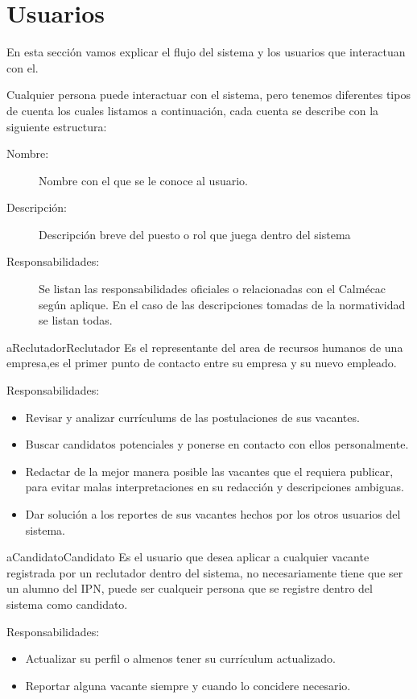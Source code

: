 \chapter{Usuarios}
En esta sección vamos explicar el flujo del sistema y los usuarios que interactuan con el.

Cualquier persona puede interactuar con el sistema, pero tenemos diferentes tipos de cuenta los cuales listamos a continuación,
cada cuenta se describe con la siguiente estructura:

\begin{description}
	\item[Nombre:] Nombre con el que se le conoce al usuario.
	\item[Descripción:] Descripción breve del puesto o rol que juega dentro del sistema
	\item[Responsabilidades:] Se listan las responsabilidades oficiales o relacionadas con el Calmécac según aplique. En el caso de las descripciones tomadas de la normatividad se listan todas.
\end{description}

\begin{actor}{aReclutador}{Reclutador}{%
   Es el representante del area de recursos humanos de una empresa,es el primer punto de contacto entre su empresa y su nuevo empleado.}
    \item[Responsabilidades:] \hfill
    \begin{itemize}
        \item  Revisar y analizar currículums de las postulaciones de sus vacantes.
        \item  Buscar candidatos potenciales y ponerse en contacto con ellos personalmente.
        \item  Redactar de la mejor manera posible las vacantes que el requiera publicar, para evitar malas interpretaciones 
        en su redacción y descripciones ambiguas.
        \item Dar solución a los reportes de sus vacantes hechos por los otros usuarios del sistema.
    \end{itemize}
\end{actor}

\begin{actor}{aCandidato}{Candidato}{%
    Es el usuario que desea aplicar a cualquier vacante registrada por un reclutador dentro del sistema, no necesariamente
    tiene que ser un alumno del IPN, puede ser cualqueir persona que se registre dentro del sistema como candidato.}
     \item[Responsabilidades:] \hfill
     \begin{itemize}
         \item  Actualizar su perfil o almenos tener su currículum actualizado.
         \item  Reportar alguna vacante siempre y cuando lo concidere necesario.
     \end{itemize}
 \end{actor}

